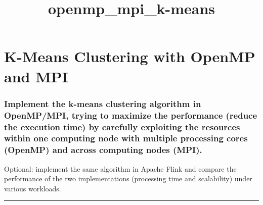 \documentclass[11pt]{article}
\title{openmp\_mpi\_k-means}
\begin{document}
    
    
    \maketitle
    
    

    
    \hypertarget{k-means-clustering-with-openmp-and-mpi}{%
\section{K-Means Clustering with OpenMP and
MPI}\label{k-means-clustering-with-openmp-and-mpi}}

\hypertarget{implement-the-k-means-clustering-algorithm-in-openmpmpi-trying-to-maximize-the-performance-reduce-the-execution-time-by-carefully-exploiting-the-resources-within-one-computing-node-with-multiple-processing-cores-openmp-and-across-computing-nodes-mpi.}{%
\subsubsection{Implement the k-means clustering algorithm in OpenMP/MPI,
trying to maximize the performance (reduce the execution time) by
carefully exploiting the resources within one computing node with
multiple processing cores (OpenMP) and across computing nodes
(MPI).}\label{implement-the-k-means-clustering-algorithm-in-openmpmpi-trying-to-maximize-the-performance-reduce-the-execution-time-by-carefully-exploiting-the-resources-within-one-computing-node-with-multiple-processing-cores-openmp-and-across-computing-nodes-mpi.}}

Optional: implement the same algorithm in Apache Flink and compare the
performance of the two implementations (processing time and scalability)
under various workloads.

\begin{center}\rule{0.5\linewidth}{\linethickness}\end{center}
\end{document}
